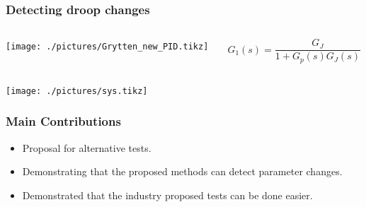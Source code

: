 \begin{frame}
	\frametitle{Detecting droop changes}
	\begin{columns}
		\begin{column}{0.65\textwidth}
			\texttt{[image: ./pictures/Grytten\_new\_PID.tikz]}
		\end{column}
		\begin{column}{0.35\textwidth}
			\begin{equation*}
				G_1(s) = \frac{G_{J}}{1+G_p(s)G_J(s)}
			\end{equation*}
		\end{column}
	\end{columns}
	\texttt{[image: ./pictures/sys.tikz]}
\end{frame}	
\begin{frame}
	\frametitle{Main Contributions}
	\begin{itemize}
		\item Proposal for alternative tests.
		\item Demonstrating that the proposed methods can detect parameter changes.
		\item Demonstrated that the industry proposed tests can be done easier.
	\end{itemize}
\end{frame}
